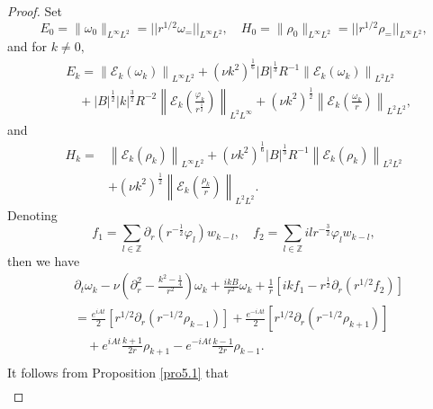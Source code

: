 \documentclass[final, 12pt,reqno]{amsart}
\numberwithin{equation}{section}
\begin{document}
\begin{proof}
Set $$E_0=\|\omega_0\|_{L^\infty L^2}=||    r^{1/2}\omega_=||_{L^\infty L^2},\quad H_0=\|\rho_0\|_{L^\infty L^2}=||r^{1/2}\rho_=||_{L^\infty L^2},$$ and for $k\neq 0,$
 \begin{equation}
 \begin{aligned}
      &E_k= \left\|\mathcal{E}_k (\omega_k)\right\|_{L^{\infty} L^2}+\left(\nu k^2\right)^{\frac{1}{6}}|B|^{\frac{1}{3}} R^{-1}\left\|\mathcal{E}_k (\omega_k)\right\|_{L^2 L^2}\\
      &\quad+|B|^{\frac{1}{2}}|k|^{\frac{3}{2}}R^{-2}\left\|\mathcal{E}_k (\frac{\varphi_k}{r^{\frac{1}{2}}})\right\|_{L^2 L^\infty}+\left(\nu k^2\right)^{\frac{1}{2}}\left\|\mathcal{E}_k (\frac{\omega_k}{r})\right\|_{L^2 L^2},
     \end{aligned}
 \end{equation}
    and
 \begin{equation}
     \begin{aligned}
 H_k= &\left\|\mathcal{E}_k (\rho_k)\right\|_{L^{\infty} L^2}+\left(\nu k^2\right)^{\frac{1}{6}}|B|^{\frac{1}{3}} R^{-1}\left\|\mathcal{E}_k (\rho_k)\right\|_{L^2 L^2}\\
 &+\left(\nu k^2\right)^{\frac{1}{2}}\left\|\mathcal{E}_k (\frac{\rho_k}{r})\right\|_{L^2 L^2}.
\end{aligned}
 \end{equation}
Denoting $$
f_1=\sum_{l \in \mathbb{Z}} \partial_r\left(r^{-\frac{1}{2}} \varphi_l\right) w_{k-l}, \quad f_2=\sum_{l \in \mathbb{Z}} i l r^{-\frac{3}{2}} \varphi_l w_{k-l},
$$ then we have
\begin{equation}
\begin{aligned}
&   \partial_t \omega_k-\nu\left(\partial_r^2-\frac{k^2-\frac{1}{4}}{r^2}\right) \omega_k+\frac{i k B}{r^2} \omega_k +\frac{1}{r}\left[i k f_1-r^{\frac{1}{2}} \partial_r\left( r^{1/2} f_2\right)\right]\\
&=\frac{e^{iAt}}{2}\left[ r^{1/2}\partial_{r}(r^{-1/2}\rho_{k-1})\right]
+\frac{e^{-iAt}}{2}\left[ r^{1/2}\partial_{r}(r^{-1/2}\rho_{k+1})\right]\\
&\quad+e^{iAt}\frac{k+1}{2r}\rho_{k+1}-e^{-iAt}\frac{k-1}{2r}\rho_{k-1}.\\
        \end{aligned}
            \end{equation}
 It follows from Proposition \ref{pro5.1} that
 \begin{equation}\label{6.12}
     \begin{aligned}

\end{aligned}
\end{equation}
\end{proof}
\end{document}
